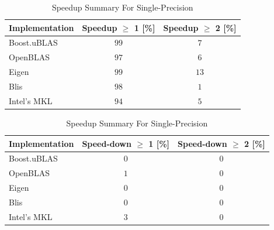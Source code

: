 \begin{table}[ht]
    \centering
    \caption{Speedup Summary For Single-Precision}
    \begin{tabular}{|l|c|c|}
        \hline
        \textbf{Implementation} & \textbf{Speedup $\geq$ 1 [\%]} & \textbf{Speedup $\geq$ 2 [\%]}\\
        \hline
        Boost.uBLAS & $99$ & $7$ \\
        \hline
        OpenBLAS    & $97$ & $6$ \\
        \hline
        Eigen       & $99$ & $13$ \\
        \hline
        Blis        & $98$ & $1$ \\
        \hline
        Intel's MKL & $94$ & $5$ \\
        \hline
    \end{tabular}

    \begin{tabular}{|l|c|c|}
        \hline
        \textbf{Implementation} & \textbf{Speed-down $\geq$ 1 [\%]} & \textbf{Speed-down $\geq$ 2 [\%]}\\
        \hline
        Boost.uBLAS & $0$ & $0$ \\
        \hline
        OpenBLAS    & $1$ & $0$ \\
        \hline
        Eigen       & $0$ & $0$ \\
        \hline
        Blis        & $0$ & $0$ \\
        \hline
        Intel's MKL & $3$ & $0$ \\
        \hline
    \end{tabular}
\end{table}

